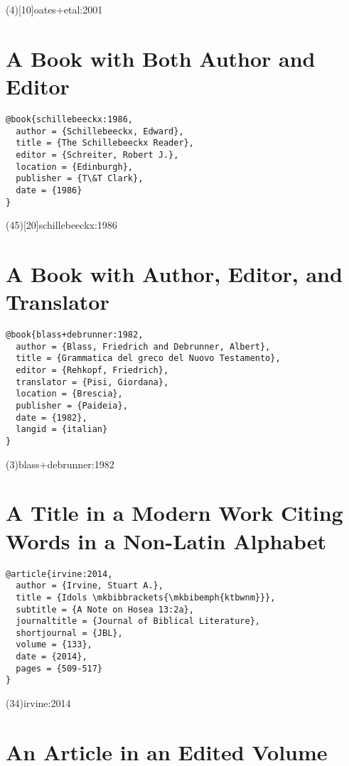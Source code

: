 \documentclass[a4paper]{article}
\begin{document}
\examplecite(4)[10]{oates+etal:2001}
\exampleabbreviations
\examplebibliography

\section{A Book with Both Author and Editor}

\begin{verbatim}
@book{schillebeeckx:1986,
  author = {Schillebeeckx, Edward},
  title = {The Schillebeeckx Reader},
  editor = {Schreiter, Robert J.},
  location = {Edinburgh},
  publisher = {T\&T Clark},
  date = {1986}
}
\end{verbatim}

\examplecite(45)[20]{schillebeeckx:1986}
\examplebibliography

\section{A Book with Author, Editor, and Translator}

\begin{verbatim}
@book{blass+debrunner:1982,
  author = {Blass, Friedrich and Debrunner, Albert},
  title = {Grammatica del greco del Nuovo Testamento},
  editor = {Rehkopf, Friedrich},
  translator = {Pisi, Giordana},
  location = {Brescia},
  publisher = {Paideia},
  date = {1982},
  langid = {italian}
}
\end{verbatim}

\examplecite(3){blass+debrunner:1982}
\examplebibliography

\section{A Title in a Modern Work Citing Words in a Non-Latin Alphabet}

\begin{verbatim}
@article{irvine:2014,
  author = {Irvine, Stuart A.},
  title = {Idols \mkbibbrackets{\mkbibemph{ktbwnm}}},
  subtitle = {A Note on Hosea 13:2a},
  journaltitle = {Journal of Biblical Literature},
  shortjournal = {JBL},
  volume = {133},
  date = {2014},
  pages = {509-517}
}
\end{verbatim}

\examplecite(34){irvine:2014}
\exampleabbreviations
\examplebibliography

\section{An Article in an Edited Volume}
\end{document}
